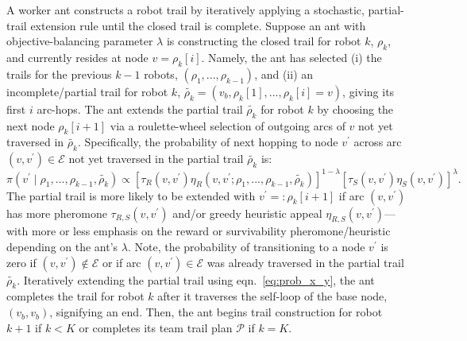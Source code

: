 \documentclass[fleqn,10pt,lineno]{wlpeerj}
\begin{document}
A worker ant constructs a robot trail by iteratively applying a stochastic, partial-trail extension rule until the closed trail is complete. Suppose an ant with objective-balancing parameter $\lambda$ is constructing the closed trail for robot $k$, $\rho_k$, and currently resides at node $v=\rho_k[i]$.
Namely, the ant has selected (i) the trails for the previous $k-1$ robots, $(\rho_1, ..., \rho_{k-1})$, and (ii) an incomplete/partial trail for robot $k$, $\tilde{\rho_k}=(v_b, \rho_k[1], ..., \rho_k[i]=v)$, giving its first $i$ arc-hops.
The ant extends the partial trail $\tilde{\rho_k}$ for robot $k$ by choosing the next node $\rho_k[i+1]$  
via a roulette-wheel selection of outgoing arcs of $v$ not yet traversed in $\tilde{\rho_k}$.
Specifically, the probability of next hopping to node $v^\prime$ across arc $(v, v^\prime)\in\mathcal{E}$ not yet traversed in the partial trail $\tilde{\rho_k}$ is:
 \begin{equation}
	\pi(v^\prime \mid \rho_1, ..., \rho_{k-1}, \tilde{\rho_k}) \propto 
		 \left[\tau_R(v, v^\prime) \eta_R(v, v^\prime; \rho_1, ..., \rho_{k-1},\tilde{\rho_k}) \right]^{1-\lambda} \left[ \tau_S(v, v^\prime) \eta_S(v, v^\prime) \right]^\lambda.
	 \label{eq:prob_x_y}
\end{equation}
The partial trail is more likely to be extended with $v^\prime=:\rho_k[i+1]$ if arc $(v, v^\prime)$ has more pheromone $\tau_{R, S}(v, v^\prime)$ and/or greedy heuristic appeal $\eta_{R, S}(v, v^\prime)$---with more or less emphasis on the reward or survivability pheromone/heuristic depending on the ant's $\lambda$.
Note, the probability of transitioning to a node $v^\prime$ is zero if $(v, v^\prime) \notin \mathcal{E}$ or if arc $(v, v^\prime) \in \mathcal{E}$ was already traversed in the partial trail $\tilde{\rho_k}$.
Iteratively extending the partial trail using eqn.~\ref{eq:prob_x_y}, the ant completes the trail for robot $k$ after it traverses the self-loop of the base node, $(v_b, v_b)$, signifying an end. Then, the ant begins trail construction for robot $k+1$ if $k<K$ or completes its team trail plan $\mathcal{P}$ if $k=K$. 


\end{document}
